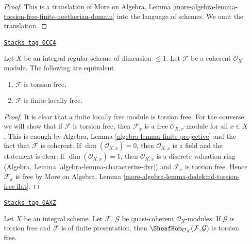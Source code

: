 \begin{proof}
This is a translation of More on Algebra, Lemma
\ref{more-algebra-lemma-torsion-free-finite-noetherian-domain}
into the language of schemes. We omit the translation.
\end{proof}

\begin{lemma}
\label{divisors-lemma-torsion-free-over-regular-dim-1}
\href{https://stacks.math.columbia.edu/tag/0CC4}{\texttt{Stacks tag 0CC4}}

Let $X$ be an integral regular scheme of dimension $\leq 1$.
Let $\mathcal{F}$ be a coherent $\mathcal{O}_X$-module.
The following are equivalent
\begin{enumerate}
\item $\mathcal{F}$ is torsion free,
\item $\mathcal{F}$ is finite locally free.
\end{enumerate}
\end{lemma}

\begin{proof}
It is clear that a finite locally free module is torsion free.
For the converse, we will show that if $\mathcal{F}$ is
torsion free, then $\mathcal{F}_x$ is a free $\mathcal{O}_{X, x}$-module
for all $x \in X$. This is enough by
Algebra, Lemma \ref{algebra-lemma-finite-projective}
and the fact that $\mathcal{F}$ is coherent.
If $\dim(\mathcal{O}_{X, x}) = 0$, then
$\mathcal{O}_{X, x}$ is a field and the statement is clear.
If $\dim(\mathcal{O}_{X, x}) = 1$, then $\mathcal{O}_{X, x}$
is a discrete valuation ring
(Algebra, Lemma \ref{algebra-lemma-characterize-dvr})
and $\mathcal{F}_x$ is torsion free.
Hence $\mathcal{F}_x$ is free by More on Algebra, Lemma
\ref{more-algebra-lemma-dedekind-torsion-free-flat}.
\end{proof}

\begin{lemma}
\label{divisors-lemma-hom-into-torsion-free}
\href{https://stacks.math.columbia.edu/tag/0AXZ}{\texttt{Stacks tag 0AXZ}}

Let $X$ be an integral scheme. Let $\mathcal{F}$, $\mathcal{G}$ be
quasi-coherent $\mathcal{O}_X$-modules.
If $\mathcal{G}$ is torsion free and $\mathcal{F}$ is of finite presentation,
then $\SheafHom_{\mathcal{O}_X}(\mathcal{F}, \mathcal{G})$ is torsion free.
\end{lemma}

